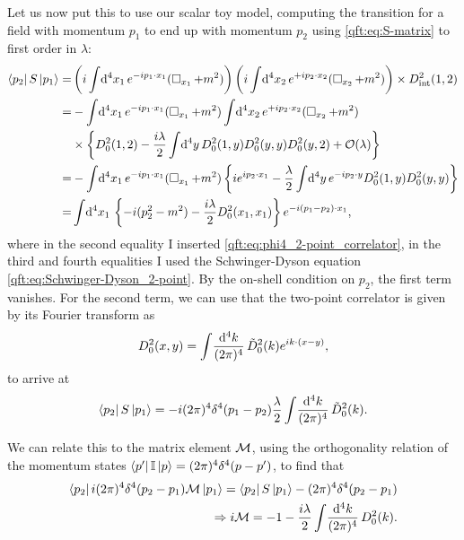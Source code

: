 \documentclass[../main.tex]{subfiles}
\begin{document}
Let us now put this to use our scalar toy model, computing the transition for a field with momentum \(p_1\) to end up with momentum \(p_2\) using \cref{qft:eq:S-matrix} to first order in \(\lambda\):
\begin{align}
  \nonumber
  \bra{p_2} S \ket{p_1} = & \pclosed{i\integral{^4x_1} \exp{-ip_1 \cdot x_1} (\dA_{x_1} + m^2)} \pclosed{ i \integral{^4x_2} \exp{+ip_2 \cdot x_2} (\dA_{x_2} + m^2)} \times D_{\text{int}}^2(1, 2) \\
  \nonumber
  =                       & -\integral{^4x_1} \exp{-ip_1 \cdot x_1} (\dA_{x_1} + m^2) \integral{^4x_2} \exp{+ip_2 \cdot x_2} (\dA_{x_2} + m^2)                                                      \\
  \nonumber
                          & \times \cclosed{D_0^2(1,2) - \frac{i\lambda}{2} \integral{^4y} D_0^2(1,y)D_0^2(y,y) D_0^2(y,2) + \mathcal{O}(\lambda)}                                                  \\
  \nonumber
  =                       & -\integral{^4x_1} \exp{-ip_1 \cdot x_1} (\dA_{x_1} + m^2) \cclosed{i \exp{ip_2\cdot x_1} - \frac{\lambda}{2}\integral{^4y} \exp{-ip_2\cdot y} D_0^2(1,y) D_0^2(y,y)}    \\
  =                       & \integral{^4x_1} \cclosed{-i (p^2_2 - m^2)- \frac{i\lambda}{2} D_0^2(x_1,x_1)} \exp{-i(p_1-p_2) \cdot x_1},
\end{align}
where in the second equality I inserted \cref{qft:eq:phi4_2-point_correlator}, in the third and fourth equalities I used the Schwinger-Dyson equation \cref{qft:eq:Schwinger-Dyson_2-point}.
By the on-shell condition on \(p_2\), the first term vanishes.
For the second term, we can use that the two-point correlator is given by its Fourier transform as
\begin{equation}
  D_0^2(x,y) = \int\!\frac{\mathrm{d}^{4}k}{(2\pi)^{4}}\, \tilde{D}_0^2(k) e^{ik\cdot(x-y)},
\end{equation}
to arrive at
\begin{equation}
  \left\langle p_2 \right| S \left| p_1 \right\rangle = -i(2\pi)^4 \delta^4(p_1 - p_2) \frac{\lambda}{2} \int\!\frac{\mathrm{d}^{4}k}{(2\pi)^{4}}\, \tilde{D}_0^2(k).
\end{equation}

We can relate this to the matrix element \(\mathcal{M}\), using the orthogonality relation of the momentum states \(\left\langle p^\prime \right| \operatorname{\mathbb{I}} \left| p \right\rangle = (2\pi)^4 \delta^4(p-p^\prime)\), to find that
\begin{align}
  \nonumber
  \left\langle p_2 \right| i(2\pi)^4 \delta^4(p_2-p_1) \mathcal{M} \left| p_1 \right\rangle = \left\langle p_2 \right| S \left| p_1 \right\rangle - (2\pi)^4 \delta^4(p_2-p_1) \\
  \Rightarrow i\mathcal{M} = -1 - \frac{i \lambda}{2} \int\!\frac{\mathrm{d}^{4}k}{(2\pi)^{4}}\, D_0^2(k).
\end{align}
\end{document}

